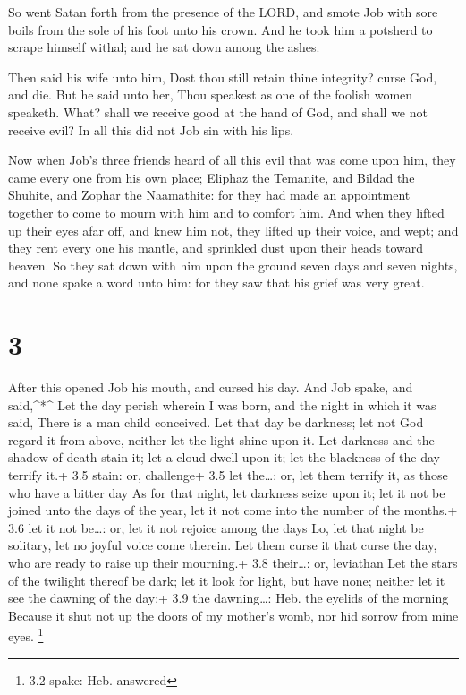  So went Satan forth from the presence of the LORD, and
smote Job with sore boils from the sole of his foot unto his crown.
 And he took him a potsherd to scrape himself withal; and he
sat down among the ashes.

 Then said his wife unto him, Dost thou still retain thine
integrity? curse God, and die.  But he said unto her, Thou
speakest as one of the foolish women speaketh. What? shall we receive
good at the hand of God, and shall we not receive evil? In all this did
not Job sin with his lips.

 Now when Job's three friends heard of all this evil that
was come upon him, they came every one from his own place; Eliphaz the
Temanite, and Bildad the Shuhite, and Zophar the Naamathite: for they
had made an appointment together to come to mourn with him and to
comfort him.  And when they lifted up their eyes afar off,
and knew him not, they lifted up their voice, and wept; and they rent
every one his mantle, and sprinkled dust upon their heads toward heaven.
 So they sat down with him upon the ground seven days and
seven nights, and none spake a word unto him: for they saw that his
grief was very great.

\hypertarget{section-2}{%
\section{3}\label{section-2}}

 After this opened Job his mouth, and cursed his day.
 And Job spake, and said,\^{}*\^{}  Let the day
perish wherein I was born, and the night in which it was said, There is
a man child conceived.  Let that day be darkness; let not
God regard it from above, neither let the light shine upon it.
 Let darkness and the shadow of death stain it; let a cloud
dwell upon it; let the blackness of the day terrify it.+ 3.5 stain: or,
challenge+ 3.5 let the\ldots: or, let them terrify it, as those who have
a bitter day  As for that night, let darkness seize upon it;
let it not be joined unto the days of the year, let it not come into the
number of the months.+ 3.6 let it not be\ldots: or, let it not rejoice
among the days  Lo, let that night be solitary, let no
joyful voice come therein.  Let them curse it that curse the
day, who are ready to raise up their mourning.+ 3.8 their\ldots: or,
leviathan  Let the stars of the twilight thereof be dark;
let it look for light, but have none; neither let it see the dawning of
the day:+ 3.9 the dawning\ldots: Heb. the eyelids of the morning
 Because it shut not up the doors of my mother's womb, nor
hid sorrow from mine eyes. \footnote{3.2 spake: Heb. answered}

